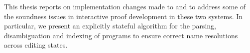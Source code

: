 This thesis reports on implementation changes made to \Beluga and \Harpoon to address some of the soundness issues in interactive proof development in these two systems.
In particular, we present an explicitly stateful algorithm for the parsing, disambiguation and indexing of \Beluga programs to ensure correct name resolutions across editing states.

